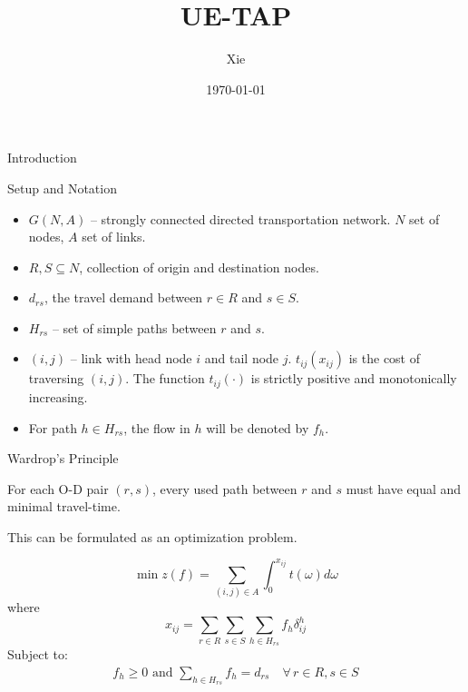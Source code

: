 \documentclass{beamer}
\title{UE-TAP}
\author{Xie}
\date{\today}
\begin{document}
\begin{frame}
    \titlepage
\end{frame}

\begin{frame}{Introduction}
\end{frame}

\begin{frame}{Setup and Notation}
\begin{itemize}
    \item $G(N,A)$ -- strongly connected directed transportation network.
    $N$ set of nodes, $A$ set of links.

    \item $R, S\subseteq N$, collection of origin and destination nodes.

    \item $d_{rs}$, the travel demand between $r\in R$ and $s\in S$.

    \item $H_{rs}$ -- set of simple paths between $r$ and $s$.

    \item $(i,j)$ -- link with head node $i$ and tail node $j$.
    $t_{ij}(x_{ij})$ is the cost of traversing $(i,j)$. The
    function $t_{ij}(\cdot)$ is strictly positive and monotonically
    increasing.

    \item For path $h\in H_{rs}$, the flow in $h$ will be
    denoted by $f_h$.
\end{itemize}
\end{frame}

\begin{frame}{Wardrop's Principle}
\begin{definition}[UE-Condition]
    For each O-D pair $(r,s)$, every used path between $r$ and
    $s$ must have equal and minimal travel-time.
\end{definition}

This can be formulated as an optimization problem.

\[
    \min z(f) = \sum_{(i,j)\in A} \int_0^{
    x_{ij}
    } t(\omega)d\omega
\]
where
\[
    x_{ij} = \sum_{r\in R}\sum_{s\in S}\sum_{h\in H_{rs}}f_h
    \delta_{ij}^h
\]
Subject to:
\[
\begin{split}
    f_h\geq 0 \text{ and }\sum_{h\in H_{rs}} f_h = d_{rs}\quad \forall\, r\in R,s\in S
\end{split}
\]
\end{frame}
\end{document}
